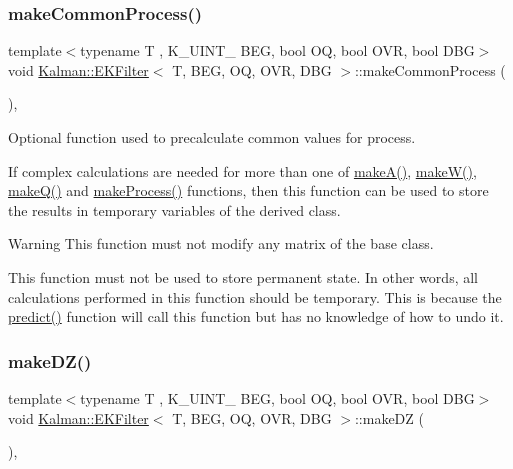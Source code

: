 \subsubsection{\texorpdfstring{make\+Common\+Process()}{makeCommonProcess()}}
{\footnotesize\ttfamily template$<$typename T , K\+\_\+\+U\+I\+N\+T\+\_ B\+EG, bool OQ, bool O\+VR, bool D\+BG$>$ \\
void \mbox{\hyperlink{classKalman_1_1EKFilter}{Kalman\+::\+E\+K\+Filter}}$<$ T, B\+EG, OQ, O\+VR, D\+BG $>$\+::make\+Common\+Process (\begin{DoxyParamCaption}{ }\end{DoxyParamCaption})\hspace{0.3cm}{\ttfamily [protected]}, {\ttfamily [virtual]}}



Optional function used to precalculate common values for process. 

If complex calculations are needed for more than one of {\ttfamily \mbox{\hyperlink{classKalman_1_1EKFilter_aa2cd9e16f121fe26802a133b4cb37f59}{make\+A()}}}, {\ttfamily \mbox{\hyperlink{classKalman_1_1EKFilter_ac0ea9285a523d219835f7ca2ce932902}{make\+W()}}}, {\ttfamily \mbox{\hyperlink{classKalman_1_1EKFilter_ab9765c4cbe0f67a1aa82ddfbc8173877}{make\+Q()}}} and {\ttfamily \mbox{\hyperlink{classKalman_1_1EKFilter_a778232d397d981c08b3ca23ea800aa6a}{make\+Process()}}} functions, then this function can be used to store the results in temporary variables of the derived class. \begin{DoxyWarning}{Warning}
This function must not modify any matrix of the base class. 

This function must not be used to store permanent state. In other words, all calculations performed in this function should be temporary. This is because the {\ttfamily \mbox{\hyperlink{classKalman_1_1EKFilter_a5f50329514f21971663ae6d4a26a1bb6}{predict()}}} function will call this function but has no knowledge of how to undo it. 
\end{DoxyWarning}
\mbox{\label{classKalman_1_1EKFilter_a54a168299879f6b3023b0a42b1afe29d}} 
\subsubsection{\texorpdfstring{make\+D\+Z()}{makeDZ()}}
{\footnotesize\ttfamily template$<$typename T , K\+\_\+\+U\+I\+N\+T\+\_ B\+EG, bool OQ, bool O\+VR, bool D\+BG$>$ \\
void \mbox{\hyperlink{classKalman_1_1EKFilter}{Kalman\+::\+E\+K\+Filter}}$<$ T, B\+EG, OQ, O\+VR, D\+BG $>$\+::make\+DZ (\begin{DoxyParamCaption}{ }\end{DoxyParamCaption})\hspace{0.3cm}{\ttfamily [protected]}, {\ttfamily [virtual]}}




